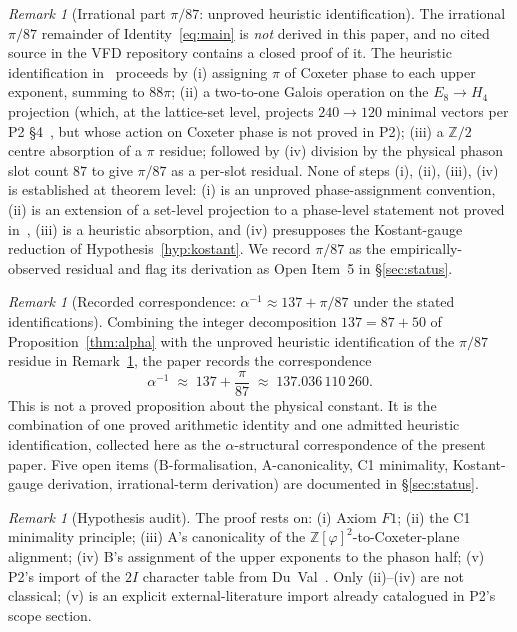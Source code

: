 \documentclass[12pt]{article}
\theoremstyle{definition}
\theoremstyle{remark}
\newtheorem{remark}[theorem]{Remark}
\newcommand{\Z}{\mathbb{Z}}
\newcommand{\Zphi}{\mathbb{Z}[\varphi]}
\begin{document}
\begin{remark}[Irrational part $\pi / 87$: unproved heuristic identification]\label{rem:irrational}
The irrational $\pi/87$ remainder of Identity~\eqref{eq:main} is \emph{not} derived in this paper, and no cited source in the VFD repository contains a closed proof of it. The heuristic identification in~\citep{CascadeIdentityC, CascadeABclosure} proceeds by (i) assigning $\pi$ of Coxeter phase to each upper exponent, summing to $88\pi$; (ii) a two-to-one Galois operation on the $E_8 \to H_4$ projection (which, at the lattice-set level, projects $240 \to 120$ minimal vectors per P2 \S 4~\citep{CascadeAlgSubstrate}, but whose action on Coxeter phase is not proved in P2); (iii) a $\Z/2$ centre absorption of a $\pi$ residue; followed by (iv) division by the physical phason slot count $87$ to give $\pi/87$ as a per-slot residual. None of steps (i), (ii), (iii), (iv) is established at theorem level: (i) is an unproved phase-assignment convention, (ii) is an extension of a set-level projection to a phase-level statement not proved in~\citep{CascadeAlgSubstrate}, (iii) is a heuristic absorption, and (iv) presupposes the Kostant-gauge reduction of Hypothesis~\ref{hyp:kostant}. We record $\pi/87$ as the empirically-observed residual and flag its derivation as Open Item~5 in \S\ref{sec:status}.
\end{remark}

\begin{remark}[Recorded correspondence: $\alpha^{-1} \approx 137 + \pi/87$ under the stated identifications]\label{thm:alpha-full}
Combining the integer decomposition $137 = 87 + 50$ of Proposition~\ref{thm:alpha} with the unproved heuristic identification of the $\pi/87$ residue in Remark~\ref{rem:irrational}, the paper records the correspondence
\[
  \alpha^{-1} \;\approx\; 137 + \frac{\pi}{87} \;\approx\; 137.036\,110\,260.
\]
This is not a proved proposition about the physical constant. It is the combination of one proved arithmetic identity and one admitted heuristic identification, collected here as the $\alpha$-structural correspondence of the present paper. Five open items (B-formalisation, A-canonicality, C1 minimality, Kostant-gauge derivation, irrational-term derivation) are documented in \S\ref{sec:status}.
\end{remark}

\begin{remark}[Hypothesis audit]
The proof rests on: (i) Axiom $F1$; (ii) the C1 minimality principle; (iii) A's canonicality of the $\Zphi^2$-to-Coxeter-plane alignment; (iv) B's assignment of the upper exponents to the phason half; (v) P2's import of the $2I$ character table from Du~Val~\citep{DuVal1964}. Only (ii)--(iv) are not classical; (v) is an explicit external-literature import already catalogued in P2's scope section.
\end{remark}
\end{document}
